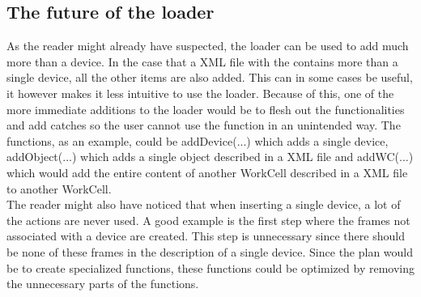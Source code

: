 \subsection{The future of the loader}
\label{subsec:futureLoader}
As the reader might already have suspected, the loader can be used to add much more than a device. In the case that a XML file with the contains more than a single device, all the other items are also added. This can in some cases be useful, it however makes it less intuitive to use the loader. Because of this, one of the more immediate additions to the loader would be to flesh out the functionalities and add catches so the user cannot use the function in an unintended way. The functions, as an example, could be addDevice(...) which adds a single device, addObject(...) which adds a single object described in a XML file and addWC(...) which would add the entire content of another WorkCell described in a XML file to another WorkCell.\\
The reader might also have noticed that when inserting a single device, a lot of the actions are never used. A good example is the first step where the frames not associated with a device are created. This step is unnecessary since there should be none of these frames in the description of a single device. Since the plan would be to create specialized functions, these functions could be optimized by removing the unnecessary parts of the functions.
